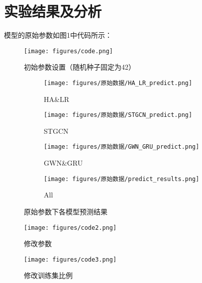 \documentclass[4pt]{article}
\begin{document}
\section{实验结果及分析}

模型的原始参数如图1中代码所示：

\begin{figure}[H]
    \centering
    \texttt{[image: figures/code.png]}
    \caption{初始参数设置（随机种子固定为42）}
    \label{fig:your_label}
\end{figure}


\begin{figure}[h]
    \centering
    \begin{subfigure}{0.423\textwidth}
        \texttt{[image: figures/原始数据/HA\_LR\_predict.png]}
        \caption{HA\&LR}
    \end{subfigure}
    \begin{subfigure}{0.45\textwidth}
        \texttt{[image: figures/原始数据/STGCN\_predict.png]}
        \caption{STGCN}
    \end{subfigure}
    \begin{subfigure}{0.45\textwidth}
        \texttt{[image: figures/原始数据/GWN\_GRU\_predict.png]}
        \caption{GWN\&GRU}
    \end{subfigure}
    \begin{subfigure}{0.45\textwidth}
        \texttt{[image: figures/原始数据/predict\_results.png]}
        \caption{All}
    \end{subfigure}
    \caption{原始参数下各模型预测结果}
\end{figure}

\begin{figure}[H]
    \centering
    \texttt{[image: figures/code2.png]}
    \caption{修改参数}
    \label{fig:your_label}
\end{figure}

\begin{figure}[H]
    \centering
    \texttt{[image: figures/code3.png]}
    \caption{修改训练集比例}
    \label{fig:your_label}
\end{figure}
\end{document}
